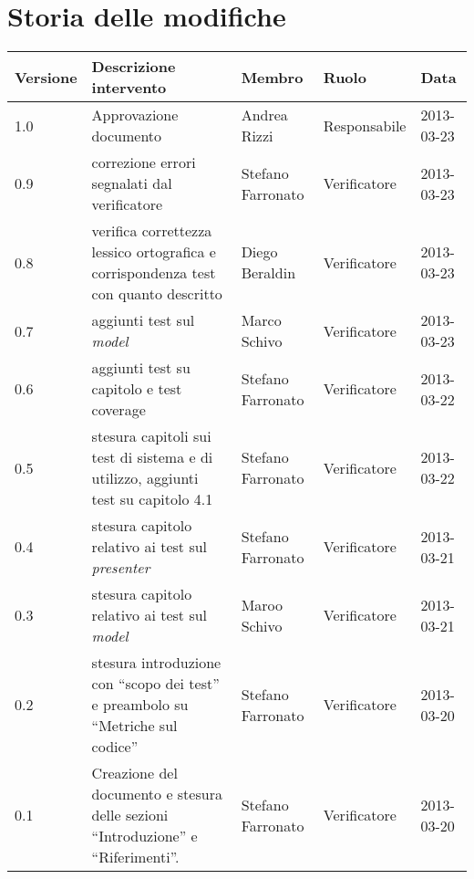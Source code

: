 

\section*{Storia delle modifiche}
\begin{center}
\begin{longtable}{lp{}lll}
\toprule
Versione & Descrizione intervento & Membro & Ruolo & Data\\
\midrule %
1.0 & Approvazione documento& Andrea Rizzi & Responsabile & 2013-03-23\\
0.9 & correzione errori segnalati dal verificatore& Stefano Farronato & Verificatore & 2013-03-23\\
0.8 & verifica correttezza lessico ortografica e corrispondenza test con quanto descritto& Diego Beraldin & Verificatore & 2013-03-23\\
0.7 & aggiunti test sul \textit{model} & Marco Schivo & Verificatore & 2013-03-23\\
0.6 & aggiunti test su capitolo e test coverage& Stefano Farronato & Verificatore & 2013-03-22\\
0.5 & stesura capitoli sui test di sistema e di utilizzo, aggiunti test su capitolo 4.1& Stefano Farronato & Verificatore & 2013-03-22\\
0.4 & stesura capitolo relativo ai test sul \textit{presenter} & Stefano Farronato & Verificatore & 2013-03-21\\
0.3 & stesura capitolo relativo ai test sul \textit{model} & Maroo Schivo & Verificatore & 2013-03-21\\
0.2 & stesura introduzione con ``scopo dei test'' e preambolo su ``Metriche sul codice''& Stefano Farronato & Verificatore & 2013-03-20\\
0.1 & Creazione del documento e stesura delle sezioni ``Introduzione'' e ``Riferimenti''. & Stefano Farronato & Verificatore & 2013-03-20\\
\bottomrule
\end{longtable}
\end{center}
\newpage

